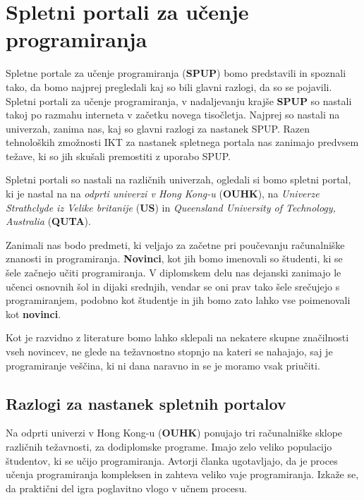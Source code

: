 \section{Spletni portali za učenje programiranja}
\label{sec:SPUP}

Spletne portale za učenje programiranja (\textbf{SPUP}) bomo
predstavili in spoznali tako, da bomo najprej pregledali kaj so bili
glavni razlogi, da so se pojavili. Spletni portali za učenje
programiranja, v nadaljevanju krajše \textbf{SPUP} so nastali takoj po
razmahu interneta v začetku novega tisočletja. Najprej so nastali na
univerzah, zanima nas, kaj so glavni razlogi za nastanek SPUP. Razen
tehnoloških zmožnosti IKT za nastanek spletnega portala nas zanimajo
predvsem težave, ki so jih skušali premostiti z uporabo SPUP.

Spletni portali so nastali na različnih univerzah, ogledali si bomo
spletni portal, ki je nastal na na \emph{odprti univerzi v Hong
  Kong-u} (\textbf{OUHK}), na \emph{Univerze Strathclyde iz Velike
  britanije} (\textbf{US}) in \emph{Queensland University of
  Technology, Australia} (\textbf {QUTA}).

Zanimali nas bodo predmeti, ki veljajo za začetne pri poučevanju
računalniške znanosti in programiranja. \textbf{Novinci}, kot jih bomo
imenovali so študenti, ki se šele začnejo učiti programiranja. V
diplomskem delu nas dejanski zanimajo le učenci osnovnih šol in dijaki
srednjih, vendar se oni prav tako šele srečujejo s programiranjem,
podobno kot študentje in jih bomo zato lahko vse poimenovali kot
\textbf{novinci}.

Kot je razvidno z literature bomo lahko sklepali na nekatere skupne
značilnosti vseh novincev, ne glede na težavnostno stopnjo na kateri
se nahajajo, saj je programiranje veščina, ki ni dana naravno in se je
moramo vsak priučiti.




\subsection{Razlogi za nastanek spletnih portalov}
\label{sec:razlogi_za_nastanek_SPUP}

Na odprti univerzi v Hong Kong-u (\textbf{OUHK}) ponujajo tri
računalniške sklope različnih težavnosti, za dodiplomske
programe. Imajo zelo veliko populacijo študentov, ki se učijo
programiranja. Avtorji članka \cite{ITaLCP_DistanceEdu}
ugotavljajo, da je proces učenja programiranja kompleksen in zahteva
veliko vaje programiranja. Izkaže se, da praktični
del igra poglavitno vlogo v učnem procesu.

